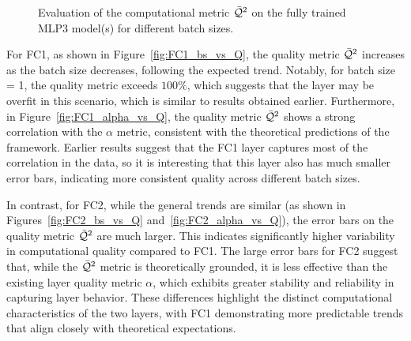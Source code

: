 \begin{figure}[h]
{        \label{fig:FC2_bs_vs_Q}
    }
    \hspace{1cm} %
    \caption{
      Evaluation of the computational \RTransform \LayerQualitySquared metric $\bar{\mathcal{Q}}^{2}$
      on the fully trained MLP3 model(s) for different batch sizes.
    }
    \label{fig:MLP3_qualities}
\end{figure}


For FC1, as shown in Figure~\ref{fig:FC1_bs_vs_Q}, the quality metric \(\bar{\mathcal{Q}}^{2}\) increases as the batch size decreases, following the expected trend. Notably, for batch size = 1, the quality metric exceeds $100\%$,
which suggests that the layer may be overfit in this scenario, which is similar to results obtained earlier. Furthermore, in Figure~\ref{fig:FC1_alpha_vs_Q}, the quality metric \(\bar{\mathcal{Q}}^{2}\) shows a strong correlation with the $\alpha$ metric, consistent with the theoretical predictions of the \HTSR framework.
Earlier results suggest that the FC1 layer captures most of the correlation in the data,
so it is interesting that this layer also has much smaller error bars, indicating more consistent quality across different batch sizes.

In contrast, for FC2, while the general trends are similar (as shown in Figures~\ref{fig:FC2_bs_vs_Q} and~\ref{fig:FC2_alpha_vs_Q}), the error bars on the quality metric $\bar{\mathcal{Q}}^{2}$ are much larger. This indicates significantly higher variability in computational quality compared to FC1. The large error bars for FC2 suggest that, while the $\bar{\mathcal{Q}}^{2}$ metric is theoretically grounded, it is less effective than the existing \HTSR layer quality metric $\alpha$, which exhibits greater stability and reliability in capturing layer behavior. These differences highlight the distinct computational characteristics of the two layers, with FC1 demonstrating more predictable trends that align closely with theoretical expectations.

